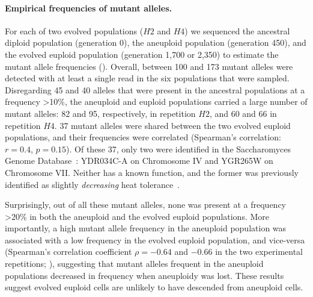 \documentclass[12pt]{extarticle}
\begin{document}
\paragraph{Empirical frequencies of mutant alleles.} 
For each of two evolved populations ($H2$ and $H4$) we sequenced the ancestral diploid population (generation 0), the aneuploid population (generation 450), and the evolved euploid population (generation 1,700 or 2,350) to estimate the mutant allele frequencies (). 
Overall, between 100 and 173 mutant alleles were detected with at least a single read in the six populations that were sampled. 
Disregarding 45 and 40 alleles that were present in the ancestral populations at a frequency >10\%, the aneuploid and euploid populations carried a large number of mutant alleles: 82 and 95, respectively, in repetition $H2$, and 60 and 66 in repetition $H4$. 37 mutant alleles were shared between the two evolved euploid populations, and their frequencies were correlated (Spearman's correlation: $r=0.4$, $p=0.15$). Of these 37, only two were identified in the Saccharomyces Genome Database~\citep{Cherry2012}: YDR034C-A on Chromosome IV and YGR265W on Chromosome VII. Neither has a known function, and the former was previously identified as slightly \emph{decreasing} heat tolerance~\citep{Jarolim2013}.

Surprisingly, out of all these mutant alleles, none was present at a frequency >20\% in both the aneuploid and the evolved euploid populations. 
More importantly, a high mutant allele frequency in the aneuploid population was associated with a low frequency in the evolved euploid population, and vice-versa (Spearman's correlation coefficient $\rho=-0.64$ and $-0.66$ in the two experimental repetitions; ), suggesting that mutant alleles frequent in the aneuploid populations decreased in frequency when aneuploidy was lost.
These results suggest evolved euploid cells are unlikely to have descended from aneuploid cells.
\end{document}
